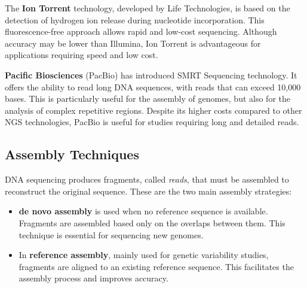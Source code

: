 	The \textbf{Ion Torrent} technology, developed by Life Technologies, is based on the detection of hydrogen ion release during nucleotide incorporation. This fluorescence-free approach allows rapid and low-cost sequencing. Although accuracy may be lower than Illumina, Ion Torrent is advantageous for applications requiring speed and low cost.
	
	\textbf{Pacific Biosciences} (\acs{PacBio}) has introduced \ac{SMRT} Sequencing technology. It offers the ability to read long \acs{DNA} sequences, with reads that can exceed 10,000 bases. This is particularly useful for the assembly of genomes, but also for the analysis of complex repetitive regions. Despite its higher costs compared to other \acs{NGS} technologies, \acs{PacBio} is useful for studies requiring long and detailed reads.



	\subsection{Assembly Techniques}
	\label{subsec:assembly-techniques}
	
	\acs{DNA} sequencing produces fragments, called \emph{reads}, that must be assembled to reconstruct the original sequence. These are the two main assembly strategies:
	\begin{itemize}
		\item \textbf{de novo assembly} \cite{nagarajan2013sequence} is used when no reference sequence is available. Fragments are assembled based only on the overlaps between them. This technique is essential for sequencing new genomes.
		
		\item In \textbf{reference assembly}, mainly used for genetic variability studies, fragments are aligned to an existing reference sequence. This facilitates the assembly process and improves accuracy.
	\end{itemize}
